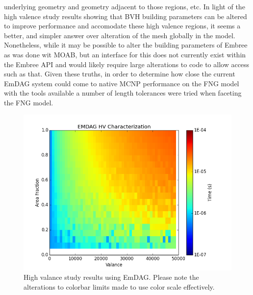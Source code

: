 \documentclass[10pt, a4paper]{article}
\begin{document}
underlying geometry and geometry adjacent to those regions, etc. In light of the high valence study results showing that BVH building parameters can be altered to improve performance and accomodate these high valence regions, it seems a better, and simpler answer over alteration of the mesh globally in the model. Nonetheless, while it may be possible to alter the building parameters of Embree as was done wit MOAB, but an interface for this does not currently exist within the Embree API and would likely require large alterations to code to allow access such as that. Given these truths, in order to determine how close the current EmDAG system could come to native MCNP performance on the FNG model with the tools available a number of length tolerances were tried when faceting the FNG model.  

\begin{figure}[H]
  \begin{center}
    \includegraphics[scale=0.35]{hv_emdag.png}
    \caption{High valance study results using EmDAG. Please note the alterations to colorbar limits made to use color scale effectively.}
    \label{emdaghvstudy}
  \end{center}
\end{figure}
\end{document}

